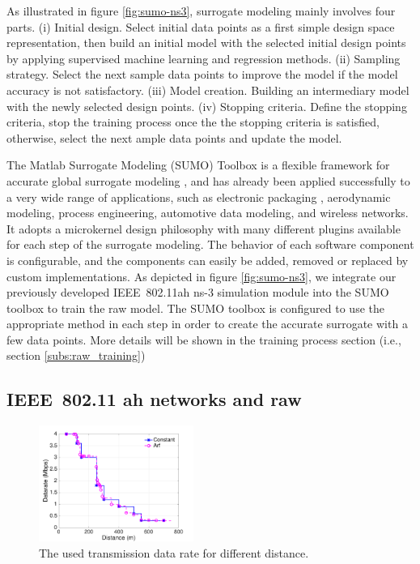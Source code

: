  As illustrated in figure \ref{fig:sumo-ns3},  surrogate modeling mainly involves four parts. (i) Initial design. Select initial data points as a first simple design space representation, then build an initial model with the selected initial design points by applying supervised machine learning and regression methods. (ii) Sampling strategy. Select the next sample data points to improve the model if the model accuracy is not satisfactory. (iii) Model creation. Building an intermediary model with the newly selected design points. (iv) Stopping criteria. Define the stopping criteria, stop the training process once the the stopping criteria is satisfied, otherwise, select the next ample data points and update the model. 
 
 The Matlab Surrogate Modeling (SUMO) Toolbox is a flexible framework for accurate global surrogate modeling \cite{SUMOtoolbox2010}, and has already been applied successfully to a very wide range of applications, such as electronic packaging , aerodynamic modeling, process engineering, automotive data modeling, and wireless networks.
 It adopts a microkernel design philosophy with many different plugins available for each step of the surrogate modeling. The behavior of each software component is configurable, and the components can easily be added, removed or replaced by custom implementations. As depicted in figure \ref{fig:sumo-ns3}, we integrate our previously developed IEEE~802.11ah ns-3 simulation module \cite{WNS32018} into the SUMO toolbox to train the \gls{raw} model. The SUMO toolbox is configured to use the appropriate method in each step in order to create the accurate surrogate with a few data points. More details will be shown in the training process section (i.e., section \ref{subs:raw_training})
 


\subsection{IEEE~802.11 ah networks and \gls{raw} \label{subsec:80211ah_raw}}

\begin{figure}[t]
  \centering
  \includegraphics[width=0.45\textwidth]{figures/distance-datarate-512bytes}  \caption{The used transmission data rate for different distance. \label{fig:dist-datarate}}
\end{figure}

